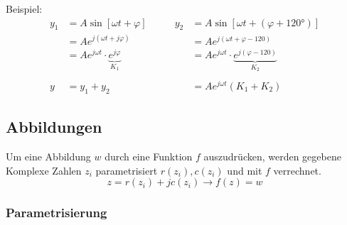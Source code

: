 \noindent Beispiel:
\begin{align*}
	y_1 &= A\sin[\omega t + \varphi] &\qquad y_2 &= A\sin[\omega t + (\varphi + 120°)] \\
	&= A e ^{j(\omega t + j\varphi)} &\qquad  &= A e^{j(\omega t + \varphi - 120)}\\
	&= A e ^{j\omega t} \cdot \underbrace{e^{j\varphi}}_{K_1} &\qquad  &= A e^{j\omega t} \cdot \underbrace{e^{j(\varphi - 120)}}_{K_2}\\    
	\\
	y &= y_1 + y_2 &&= A e^{j\omega t} (K_1 + K_2) 
\end{align*}

\subsection{Abbildungen}
Um eine Abbildung $w$ durch eine Funktion $f$ auszudrücken, werden gegebene Komplexe Zahlen $z_i$ parametrisiert $r(z_i), c(z_i)$ und mit $f$ verrechnet.
\[z = r(z_i) + jc(z_i) \rightarrow f(z) = w \]

\subsubsection{Parametrisierung}
